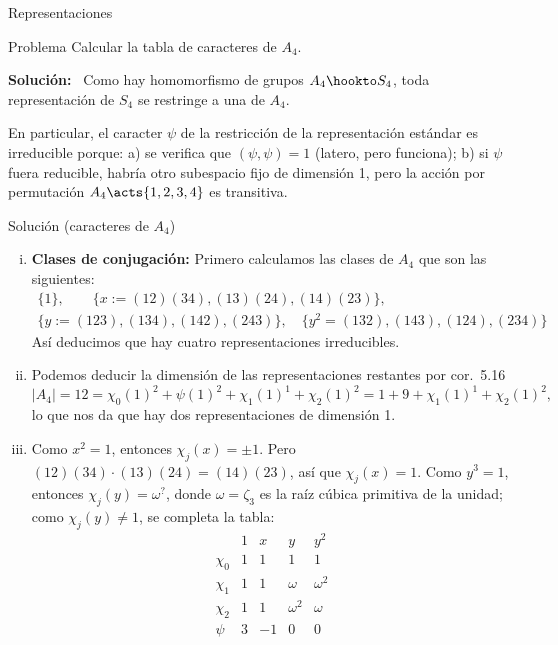 \documentclass[10pt]{beamer}
\newenvironment{sol}{\textbf{Solución:}\ }{}
\begin{document}
\begin{frame}{Representaciones} %
	\begin{block}{Problema}
		Calcular la tabla de caracteres de $A_4$. 
	\end{block}
	\begin{sol}
		Como hay homomorfismo de grupos $A_4 \hookto S_4$, toda representación de $S_4$ se restringe a una de
		$A_4$.

		\pause
		En particular, el caracter $\psi$ de la restricción de la representación estándar es irreducible porque:
		\pause
		a) se verifica que $(\psi, \psi) = 1$ (latero, pero funciona);
		\pause
		b) si $\psi$ fuera reducible, habría otro subespacio fijo de dimensión 1, pero la acción por permutación
		$A_4 \acts \{ 1, 2, 3, 4 \}$ es transitiva.
	\end{sol}
\end{frame}
\begin{frame}{Solución (caracteres de $A_4$)}
	\small
	\begin{enumerate}[(i), wide]
		\item \textbf{Clases de conjugación:}
			Primero calculamos las clases de $A_4$ que son las siguientes:
			\begin{gather*}
				\{ 1 \}, \qquad
				\{ x := (12)(34), (13)(24), (14)(23) \}, \\
				\{ y := (123), (134), (142), (243) \}, \quad
				\{ y^2= (132), (143), (124), (234) \}
			\end{gather*}
			Así deducimos que hay cuatro representaciones irreducibles.
		\item Podemos deducir la dimensión de las representaciones restantes por cor.~5.16
			\[
				|A_4| = 12 = \chi_0(1)^2 + \psi(1)^2 + \chi_1(1)^1 + \chi_2(1)^2 = 1 + 9 + \chi_1(1)^1 + \chi_2(1)^2,
			\]
			lo que nos da que hay dos representaciones de dimensión 1.
		\item Como $x^2 = 1$, entonces $\chi_j(x) = \pm 1$.
			\pause
			Pero $(12)(34)\cdot (13)(24) = (14)(23)$, así que $\chi_j(x) = 1$.
			\pause
			Como $y^3 = 1$, entonces $\chi_j(y) = \omega^?$, donde $\omega = \zeta_3$ es la raíz cúbica
			primitiva de la unidad; como $\chi_j(y) \ne 1$, se completa la tabla:
			\pause
			\[
				\begin{array}{c|*{4}{r}}
					{} & 1 & x & y & y^2 \\
					\hline
					\chi_0 & 1 & 1 & 1 & 1 \\
					\chi_1 & 1 & 1 & \omega & \omega^2 \\
					\chi_2 & 1 & 1 & \omega^2 & \omega \\
					\psi & 3 & -1 & 0 & 0
				\end{array}
			\]
	\end{enumerate}
\end{frame}
\end{document}
